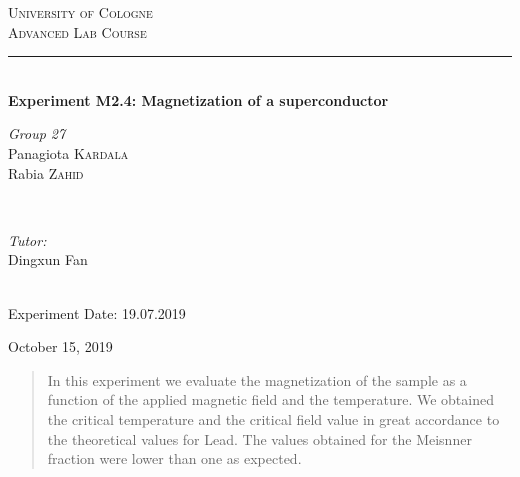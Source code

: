 \documentclass[openany,11pt,a4paper]{report}
\begin{document}
\pagestyle{empty}


\begin{titlepage}

\newcommand{\HRule}{\rule{\linewidth}{0.5mm}} 
\center 

\textsc{\LARGE University of Cologne}\\[1.5cm]
\textsc{\Large Advanced Lab Course}\\[0.5cm] 

\vfill


\HRule \\[0.4cm]
{\huge \textbf {Experiment M2.4:
Magnetization of a superconductor}}

 
\vfill

\begin{minipage}{0.4\textwidth}
\begin{flushleft} \large
\emph{Group 27}\\
Panagiota \textsc{Kardala}\\
Rabia \textsc{Zahid}
 
\end{flushleft}
\end{minipage}
~
\begin{minipage}{0.4\textwidth}
\begin{flushright} \large
\emph{Tutor:} \\
{Dingxun Fan } 
\end{flushright}
\end{minipage}\\[4cm]

Experiment Date: 19.07.2019 

\vfill

{\large October 15, 2019}\\[3cm] 

\vfill

\end{titlepage}



\pagestyle{plain}

\tableofcontents







\begin{abstract}
In this experiment we evaluate the magnetization of the sample as a function of the applied magnetic field and the temperature. We obtained the critical temperature and the critical field value in great accordance to the theoretical values for Lead. The values obtained for the Meisnner fraction were lower than one as expected.

\end{abstract}
\end{document}
